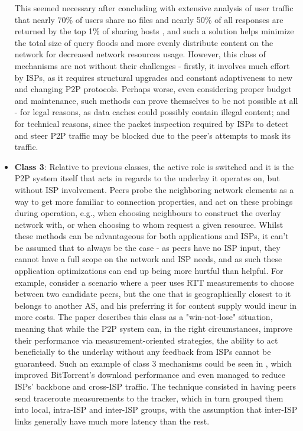 \begin{itemize}
            This seemed necessary after concluding with extensive analysis of user traffic that nearly 70\% of users share no files and nearly 50\% of all responses are returned by the top 1\% of sharing hosts \cite{freeriding-gnutella}, and such a solution  helps minimize the total size of query floods and more evenly distribute content on the network for decreased network resources usage.
            However, this class of mechanisms are not without their challenges - firstly, it involves much effort by ISPs, as it requires structural upgrades and constant adaptiveness to new and changing P2P protocols.
            Perhaps worse, even considering proper budget and maintenance, such methods can prove themselves to be not possible at all - for legal reasons, as data caches could possibly contain illegal content; and for technical reasons, since the packet inspection required by ISPs to detect and steer P2P traffic may be blocked due to the peer's attempts to mask its traffic.
        \item \textbf{Class 3}:
            Relative to previous classes, the active role is switched and it is the P2P system itself that acts in regards to the underlay it operates on, but without ISP involvement.
            Peers probe the neighboring network elements as a way to get more familiar to connection properties, and act on these probings during operation, e.g., when choosing neighbours to construct the overlay network with, or when choosing to whom request a given resource.
            Whilst these methods can be advantageous for both applications and ISPs, it can't be assumed that to always be the case - as peers have no ISP input, they cannot have a full scope on the network and ISP needs, and as such these application optimizations can end up being more hurtful than helpful.
            For example, consider a scenario where a peer uses RTT measurements to choose between two candidate peers, but the one that is geographically closest to it belongs to another AS, and his preferring it for content supply would incur in more costs.
            The paper describes this class as a "win-not-lose" situation, meaning that while the P2P system can, in the right circumstances, improve their performance via measurement-oriented strategies, the ability to act beneficially to the underlay without any feedback from ISPs cannot be guaranteed.
            Such an example of class 3 mechanisms could be seen in \cite{qin2009}, which improved BitTorrent's download performance and even managed to reduce ISPs' backbone and cross-ISP traffic.
            The technique consisted in having peers send traceroute measurements to the tracker, which in turn grouped them into local, intra-ISP and inter-ISP groups, with the assumption that inter-ISP links generally have much more latency than the rest.

\end{itemize}

